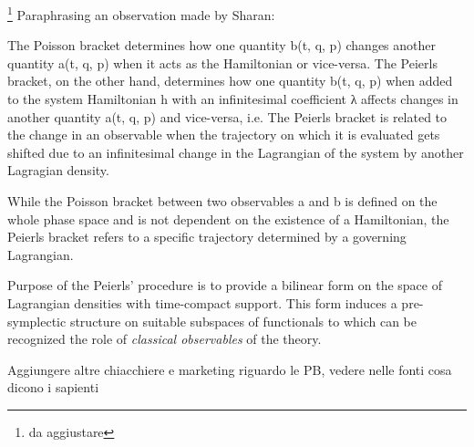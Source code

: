 \documentclass[Main]{subfiles}
\begin{document}
	\begin{observation}
	\danger\footnote{da aggiustare} Paraphrasing an observation made by Sharan\cite{Sharan2010}:
	
	The Poisson bracket determines how one quantity b(t, q, p) changes another quantity a(t, q, p) when it acts as the Hamiltonian or vice-versa. The Peierls bracket, on the other hand, determines how one quantity b(t, q, p) when added to the system Hamiltonian h with an infinitesimal coefficient λ affects changes in another quantity a(t, q, p) and vice-versa, i.e. 	The Peierls bracket is related to the change in an observable when the trajectory on which it is evaluated gets shifted due to an infinitesimal change in the Lagrangian of the system by another Lagragian density.
		
	While the Poisson bracket between two observables a and b is defined on the whole phase space and is not dependent on the existence of a Hamiltonian, the Peierls bracket refers to a specific trajectory determined by a governing Lagrangian. 
	\end{observation}

	Purpose of the Peierls' procedure is to provide a bilinear form on the space of Lagrangian densities with time-compact support.
	This form induces a pre-symplectic structure on suitable subspaces of functionals to which can be recognized the role of \emph{classical observables}  of the theory.

	\danger
	
	Aggiungere altre chiacchiere e marketing riguardo le  PB, vedere nelle fonti cosa dicono i sapienti
	
	\danger
\end{document}
